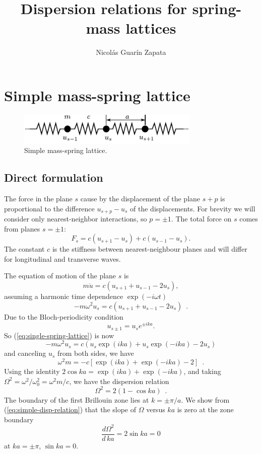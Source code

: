 \documentclass[12pt,letterpaper]{article}
\author{Nicol\'as Guar\'in Zapata}
\title{\textbf{Dispersion relations for spring-mass lattices}}
\begin{document}
\maketitle

\section{Simple mass-spring lattice}
\begin{figure}[h]
\centering
\includegraphics[height=1.5cm]{img/spring-mass.pdf} 
\caption{Simple mass-spring lattice.}
\end{figure}
\subsection{Direct formulation}
The force in the plane $s$ cause by the displacement of the plane $s+p$ is proportional to the difference $u_{s+p}-u_s$ of the displacements. For brevity we will consider only nearest-neighbor interactions, so $p=\pm 1$. The total force on $s$ comes from planes $s=\pm 1$:
\begin{equation}
F_s = c(u_{s+1}-u_s)+ c(u_{s-1}-u_s).
\end{equation}
The constant $c$ is the stiffness between nearest-neighbour planes and will differ for longitudinal and transverse waves.

The equation of motion of the plane $s$ is
\[ m  \ddot{u} = c(u_{s+1} + u_{s-1} -2 u_s), \]
assuming a harmonic time dependence $\exp(-i\omega t)$
\begin{equation}
-m\omega^2 u_s = c(u_{s+1} + u_{s-1} - 2u_s) \enspace .
\label{eq:single-spring-lattice}
\end{equation}
Due to the Bloch-periodicity condition
\[u_{s\pm 1} = u_s e^{\pm i ka}. \]
So (\ref{eq:single-spring-lattice}) is now
\[ -m \omega^2 u_s = c (u_s \exp(ika) + u_s \exp(-ika) - 2u_s) \]
and canceling $u_s$ from both sides, we have
\[ \omega^2 m = -c[ \exp(ika) + \exp(-ika) - 2 ] \enspace .\]
Using the identity $2\cos ka = \exp(ika) + \exp(-ika)$, and taking $\Omega^2 = \omega^2/\omega_0^2 = \omega^2 m/c$, we have the dispersion relation
\begin{equation}
\Omega^2 = 2 (1-\cos ka) \enspace .
\label{eq:simple-disp-relation}
\end{equation}
The boundary of the first Brillouin zone lies at $k=\pm \pi/a$. We show from (\ref{eq:simple-disp-relation}) that the slope of $\Omega$ versus $ka$ is zero at the zone boundary
\[ \frac{d\Omega^2}{d\, ka} = 2\sin ka=0\]
at $ka=\pm \pi$, $\sin ka = 0$.
\end{document}
